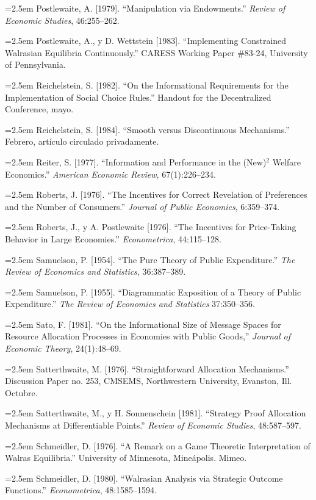 \documentclass[12pt, letterpaper]{article}
\newcommand{\bibentry}[1]{\noindent\hangindent=2.5em\hangafter=1 \small #1 \par\vspace{0.75em}}
\begin{document}
\bibentry{Postlewaite, A. [1979]. ``Manipulation via Endowments.'' \textit{Review of Economic Studies}, 46:255--262.}

\bibentry{Postlewaite, A., y D. Wettstein [1983]. ``Implementing Constrained Walrasian Equilibria Continuously.'' CARESS Working Paper \#83-24, University of Pennsylvania.}

\bibentry{Reichelstein, S. [1982]. ``On the Informational Requirements for the Implementation of Social Choice Rules.'' Handout for the Decentralized Conference, mayo.}

\bibentry{Reichelstein, S. [1984]. ``Smooth versus Discontinuous Mechanisms.'' Febrero, artículo circulado privadamente.}

\bibentry{Reiter, S. [1977]. ``Information and Performance in the (New)$^2$ Welfare Economics.'' \textit{American Economic Review}, 67(1):226--234.}

\bibentry{Roberts, J. [1976]. ``The Incentives for Correct Revelation of Preferences and the Number of Consumers.'' \textit{Journal of Public Economics}, 6:359--374.}

\bibentry{Roberts, J., y A. Postlewaite [1976]. ``The Incentives for Price-Taking Behavior in Large Economies.'' \textit{Econometrica}, 44:115--128.}

\bibentry{Samuelson, P. [1954]. ``The Pure Theory of Public Expenditure.'' \textit{The Review of Economics and Statistics}, 36:387--389.}

\bibentry{Samuelson, P. [1955]. ``Diagrammatic Exposition of a Theory of Public Expenditure.'' \textit{The Review of Economics and Statistics} 37:350--356.}

\bibentry{Sato, F. [1981]. ``On the Informational Size of Message Spaces for Resource Allocation Processes in Economies with Public Goods,'' \textit{Journal of Economic Theory}, 24(1):48--69.}

\bibentry{Satterthwaite, M. [1976]. ``Straightforward Allocation Mechanisms.'' Discussion Paper no. 253, CMSEMS, Northwestern University, Evanston, Ill. Octubre.}

\bibentry{Satterthwaite, M., y H. Sonnenschein [1981]. ``Strategy Proof Allocation Mechanisms at Differentiable Points.'' \textit{Review of Economic Studies}, 48:587--597.}

\bibentry{Schmeidler, D. [1976]. ``A Remark on a Game Theoretic Interpretation of Walras Equilibria.'' University of Minnesota, Mineápolis. Mimeo.}

\bibentry{Schmeidler, D. [1980]. ``Walrasian Analysis via Strategic Outcome Functions.'' \textit{Econometrica}, 48:1585--1594.}
\end{document}
